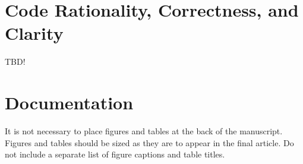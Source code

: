 \documentclass[9pt,twocolumn,twoside]{osajnl}
\begin{document}








\section{Code Rationality, Correctness, and Clarity}
\label{sec:examples}

TBD!

\section{Documentation}

It is not necessary to place figures and tables at the back of the manuscript. Figures and tables should be sized as they are to appear in the final article. Do not include a separate list of figure captions and table titles.
\end{document}
